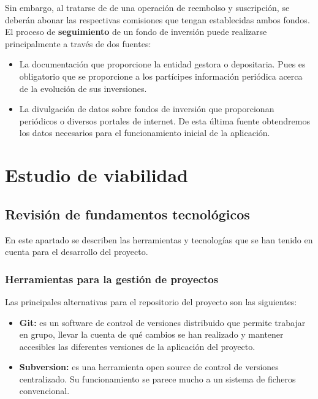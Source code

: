 \documentclass[12pt, a4paper]{book}
\begin{document}
Sin embargo, al tratarse de de una operación de reembolso y suscripción, se deberán abonar las respectivas comisiones que tengan establecidas ambos fondos.\\ 

El proceso de \textbf{seguimiento} de un fondo de inversión puede realizarse principalmente a través de dos fuentes:
\begin{itemize}
	\item La documentación que proporcione la entidad gestora o depositaria. Pues es obligatorio que se proporcione a los partícipes información periódica acerca de la evolución de sus inversiones.
	\item La divulgación de datos sobre fondos de inversión que proporcionan periódicos o diversos portales de internet. De esta última fuente obtendremos los datos necesarios para el funcionamiento inicial de la aplicación.
\end{itemize}

\newpage 

\chapter{Estudio de viabilidad}

\section{Revisión de fundamentos tecnológicos}

En este apartado se describen las herramientas y tecnologías que se han tenido en cuenta para el desarrollo del proyecto.

\subsection{Herramientas para la gestión de proyectos}

Las principales alternativas para el repositorio del proyecto son las siguientes:

\begin{itemize}
	
	\item \textbf{Git:} es un software de control de versiones distribuido que permite trabajar en grupo, llevar la cuenta de qué cambios se han realizado y mantener accesibles las diferentes versiones de la aplicación del proyecto.
	
	\item \textbf{Subversion:} es una herramienta open source de control de versiones centralizado. Su funcionamiento se parece mucho a un sistema de ficheros convencional.
	
\end{itemize}	
\end{document}
